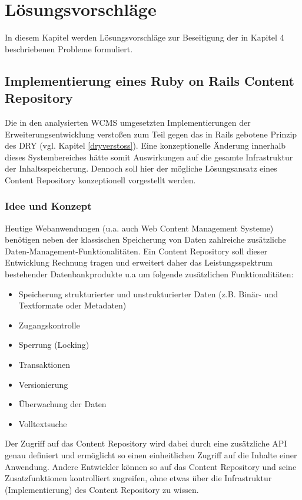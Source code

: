 \chapter{Lösungsvorschläge}
In diesem Kapitel werden Lösungsvorschläge zur Beseitigung der in Kapitel 4 beschriebenen Probleme formuliert.
\section{Implementierung eines Ruby on Rails Content Repository}

Die in den analysierten WCMS umgesetzten Implementierungen der Erweiterungsentwicklung verstoßen zum Teil gegen das in Rails gebotene Prinzip des DRY (vgl. Kapitel \ref{dryverstoss}). Eine konzeptionelle Änderung innerhalb dieses Systembereiches hätte somit Auswirkungen auf die gesamte Infrastruktur der Inhaltsspeicherung. Dennoch soll hier der mögliche Lösungsansatz eines Content Repository konzeptionell vorgestellt werden.


\subsection{Idee und Konzept}

Heutige Webanwendungen (u.a. auch Web Content Management Systeme) benötigen neben der klassischen Speicherung von Daten zahlreiche zusätzliche Daten-Management-Funktionalitäten. Ein Content Repository soll dieser Entwicklung Rechnung tragen und erweitert daher das Leistungsspektrum bestehender Datenbankprodukte u.a um folgende zusätzlichen Funktionalitäten:

\begin{itemize}
\item
Speicherung strukturierter und unstrukturierter Daten (z.B. Binär- und Textformate oder Metadaten)
\item
Zugangskontrolle
\item
Sperrung (Locking)
\item
Transaktionen
\item
Versionierung
\item
Überwachung der Daten
\item
Volltextsuche
\end{itemize}

Der Zugriff auf das Content Repository wird dabei durch eine zusätzliche API genau definiert und ermöglicht so einen einheitlichen Zugriff auf die Inhalte einer Anwendung. Andere Entwickler können so auf das Content Repository und seine Zusatzfunktionen kontrolliert zugreifen, ohne etwas über die Infrastruktur (Implementierung) des Content Repository zu wissen.

